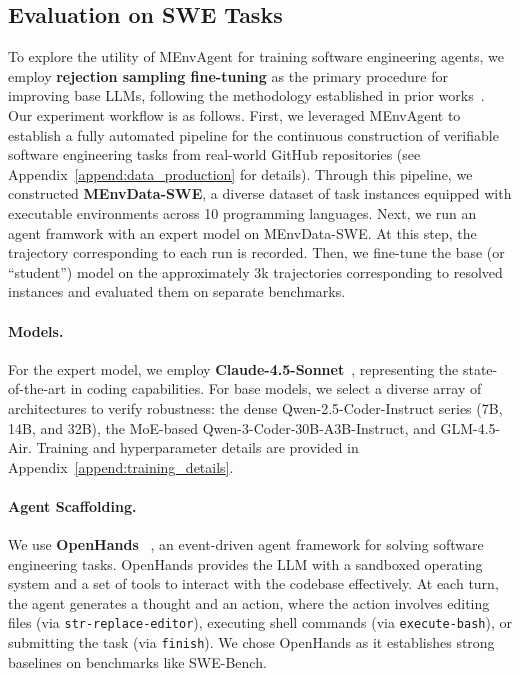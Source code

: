 \documentclass{article}
\theoremstyle{plain}
\theoremstyle{definition}
\theoremstyle{remark}
\begin{document}
\subsection{Evaluation on SWE Tasks}
\label{subsec:eval_swe}
To explore the utility of MEnvAgent for training software engineering agents, we employ \textbf{rejection sampling fine-tuning} as the primary procedure for improving base LLMs, following the methodology established in prior works~\cite{yang_swe-smith_2025,guo_swe-factory_2025,wang_swe-mirror_2025}.
Our experiment workflow is as follows. 
First, we leveraged MEnvAgent to establish a fully automated pipeline for the continuous construction of verifiable software engineering tasks from real-world GitHub repositories (see Appendix~\ref{append:data_production} for details). 
Through this pipeline, we constructed \textbf{MEnvData-SWE}, a diverse dataset of task instances equipped with executable environments across 10 programming languages.
Next, we run an agent framwork with an expert model on MEnvData-SWE. 
At this step, the trajectory corresponding to each run is recorded. Then, we fine-tune
the base (or “student”) model on the approximately 3k trajectories corresponding to resolved instances and evaluated them on separate benchmarks.

\paragraph{Models.} 
For the expert model, we employ \textbf{Claude-4.5-Sonnet}~\cite{TODO_citation}, representing the state-of-the-art in coding capabilities. 
For base models, we select a diverse array of architectures to verify robustness: the dense Qwen-2.5-Coder-Instruct series (7B, 14B, and 32B), the MoE-based Qwen-3-Coder-30B-A3B-Instruct, and GLM-4.5-Air. 
Training and hyperparameter details are provided in Appendix~\ref{append:training_details}.

\paragraph{Agent Scaffolding.} 
We use \textbf{OpenHands}~\cite{wang_openhands_2024}
, an event-driven agent framework for solving software engineering tasks. 
OpenHands provides the LLM with a sandboxed operating system and a set of tools to interact with the codebase effectively. 
At each turn, the agent generates a thought and an action, where the action involves editing files (via \texttt{str-replace-editor}), executing shell commands (via \texttt{execute-bash}), or submitting the task (via \texttt{finish}). 
We chose OpenHands as it establishes strong baselines on benchmarks like SWE-Bench. 
\end{document}
